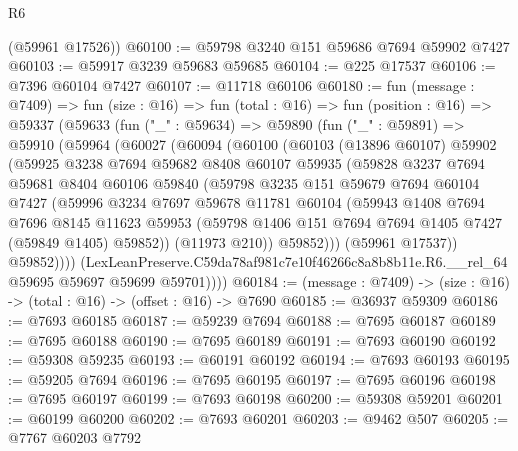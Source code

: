 \begin{lexlean}{R6}
\begin{coremodule}
      (@59961 @17526))
@60100 := @59798 @3240 @151 @59686 @7694 @59902 @7427
@60103 := @59917 @3239 @59683 @59685
@60104 := @225 @17537
@60106 := @7396 @60104 @7427
@60107 := @11718 @60106
@60180 := fun (message : @7409) =>
  fun (size : @16) =>
  fun (total : @16) =>
  fun (position : @16) =>
  @59337
    (@59633
      (fun ("_" : @59634) =>
      @59890
        (fun ("_" : @59891) =>
        @59910
          (@59964
            (@60027
              (@60094
                (@60100
                  (@60103
                    (@13896 @60107)
                    @59902
                    (@59925
                      @3238
                      @7694
                      @59682
                      @8408
                      @60107
                      @59935
                      (@59828
                        @3237
                        @7694
                        @59681
                        @8404
                        @60106
                        @59840
                        (@59798
                          @3235
                          @151
                          @59679
                          @7694
                          @60104
                          @7427
                          (@59996
                            @3234
                            @7697
                            @59678
                            @11781
                            @60104
                            (@59943
                              @1408
                              @7694
                              @7696
                              @8145
                              @11623
                              @59953
                              (@59798 @1406 @151 @7694 @7694 @1405 @7427 (@59849 @1405) @59852))
                            (@11973 @210))
                          @59852)))
                    (@59961 @17537))
                  @59852))))
          (LexLeanPreserve.C59da78af981c7e10f46266c8a8b8b11e.R6.__rel_64
            @59695
            @59697
            @59699
            @59701))))
@60184 := (message : @7409) -> (size : @16) -> (total : @16) -> (offset : @16) -> @7690
@60185 := @36937 @59309
@60186 := @7693 @60185
@60187 := @59239 @7694
@60188 := @7695 @60187
@60189 := @7695 @60188
@60190 := @7695 @60189
@60191 := @7693 @60190
@60192 := @59308 @59235
@60193 := @60191 @60192
@60194 := @7693 @60193
@60195 := @59205 @7694
@60196 := @7695 @60195
@60197 := @7695 @60196
@60198 := @7695 @60197
@60199 := @7693 @60198
@60200 := @59308 @59201
@60201 := @60199 @60200
@60202 := @7693 @60201
@60203 := @9462 @507
@60205 := @7767 @60203 @7792

\end{coremodule}
\end{lexlean}
